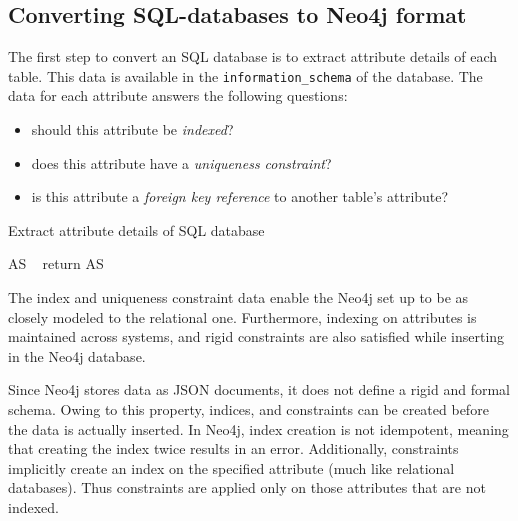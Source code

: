 \documentclass[12pt]{article}
\begin{document}
    \subsection{Converting SQL-databases to Neo4j format}
    The first step to convert an SQL database is to extract attribute details of each table. This data is available in the \verb|information_schema| of the database. The data for each attribute answers the following questions:
    \begin{itemize}
        \item should this attribute be \textit{indexed}?
        \item does this attribute have a \textit{uniqueness constraint}?
        \item is this attribute a \textit{foreign key reference} to another table's attribute?
    \end{itemize}

    \begin{algorithm}[htb!]
        \SetAlgoLined
        \caption{Extract attribute details of SQL database}
        AS \gets\ \phi{}
        return AS\;
        \label{algo:sql_attr_set}
    \end{algorithm}

    The index and uniqueness constraint data enable the Neo4j set up to be as closely modeled to the relational one. Furthermore, indexing on attributes is maintained across systems, and rigid constraints are also satisfied while inserting in the Neo4j database.

    Since Neo4j stores data as JSON documents, it does not define a rigid and formal schema. Owing to this property, indices, and constraints can be created before the data is actually inserted. In Neo4j, index creation is not idempotent, meaning that creating the index twice results in an error. Additionally, constraints implicitly create an index on the specified attribute (much like relational databases). Thus constraints are applied only on those attributes that are not indexed.
\end{document}
